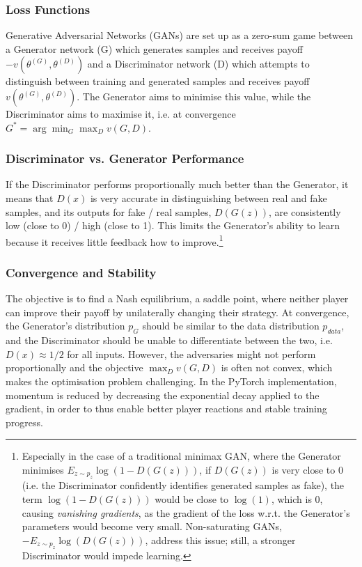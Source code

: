 \subsubsection{Loss Functions}

Generative Adversarial Networks (GANs) are set up as a zero-sum game between
a Generator network (G) which generates samples and receives payoff $-v(\theta^{(G)}, \theta^{(D)})$
and a Discriminator network (D) which attempts to distinguish between training and generated samples and receives payoff $v(\theta^{(G)}, \theta^{(D)})$.
The Generator aims to minimise this value, while the Discriminator aims to maximise it, i.e. at convergence $G^* = \arg\min_G \max_D{v(G, D)}$.

\vspace{-5pt}
\subsubsection{Discriminator vs. Generator Performance}
\vspace{-5pt}

If the Discriminator performs proportionally much better than the Generator,
it means that $D(x)$ is very accurate in distinguishing between real and fake samples,
and its outputs for fake / real samples, $D(G(z))$, are consistently low (close to 0) / high (close to 1).
This limits the Generator's ability to learn because it receives little feedback how to improve.\footnote{
    Especially in the case of a traditional minimax GAN, where the Generator minimises $E_{z \sim p_{z}} \log(1-D(G(z)))$,
    if $D(G(z))$ is very close to 0 (i.e. the Discriminator confidently identifies generated samples as fake),
    the term $\log(1-D(G(z)))$ would be close to $\log(1)$, which is 0,
    causing \textit{vanishing gradients}, as the gradient of the loss w.r.t. the Generator's parameters would become very small.
    Non-saturating GANs, $-E_{z \sim p_{z}} \log(D(G(z)))$, address this issue; still, a stronger Discriminator would impede learning.
} 

\vspace{-5pt}
\subsubsection{Convergence and Stability}
\vspace{-5pt}

The objective is to find a Nash equilibrium, a saddle point, where
neither player can improve their payoff by unilaterally changing their strategy.
At convergence, the Generator's distribution $p_G$ should be similar to the data distribution $p_{data}$,
and the Discriminator should be unable to differentiate between the two, i.e. $D(x) \approx 1/2$ for all inputs.
However, the adversaries might not perform proportionally and
the objective $\max_D{v(G,D)}$ is often not convex, which makes the optimisation problem challenging.
In the PyTorch implementation, momentum is reduced by decreasing the exponential decay applied to the gradient,
in order to thus enable better player reactions and stable training progress.

